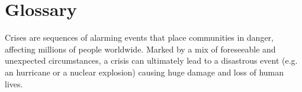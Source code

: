 \chapter{Glossary} \label{glossary}

Crises are sequences of alarming events that place communities in danger, affecting millions of people worldwide. Marked by a mix of foreseeable and unexpected circumstances, a crisis can ultimately lead to a disastrous event (e.g. an hurricane or a nuclear explosion) causing huge damage and loss of human lives.




